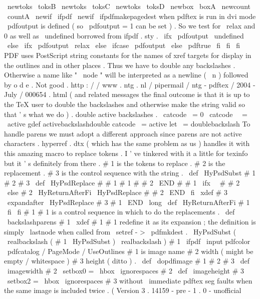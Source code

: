 {\
newtoks
\
toksB
\
newtoks
\
toksC
\
newtoks
\
toksD
\
newbox
\
boxA
\
newcount
\
countA
\
newif
\
ifpdf
\
newif
\
ifpdfmakepagedest
%
when
pdftex
is
run
in
dvi
mode
\
pdfoutput
is
defined
(
so
\
pdfoutput
=
1
%
can
be
set
)
.
So
we
test
for
\
relax
and
0
as
well
as
\
undefined
%
borrowed
from
ifpdf
.
sty
.
\
ifx
\
pdfoutput
\
undefined
\
else
\
ifx
\
pdfoutput
\
relax
\
else
\
ifcase
\
pdfoutput
\
else
\
pdftrue
\
fi
\
fi
\
fi
%
PDF
uses
PostScript
string
constants
for
the
names
of
xref
targets
%
for
display
in
the
outlines
and
in
other
places
.
Thus
we
have
to
%
double
any
backslashes
.
Otherwise
a
name
like
"
\
node
"
will
be
%
interpreted
as
a
newline
(
\
n
)
followed
by
o
d
e
.
Not
good
.
%
http
:
/
/
www
.
ntg
.
nl
/
pipermail
/
ntg
-
pdftex
/
2004
-
July
/
000654
.
html
%
(
and
related
messages
the
final
outcome
is
that
it
is
up
to
the
TeX
%
user
to
double
the
backslashes
and
otherwise
make
the
string
valid
so
%
that
'
s
what
we
do
)
.
%
double
active
backslashes
.
%
{
\
catcode
\
=
0
\
catcode
\
\
=
\
active
gdef
activebackslashdouble
{
%
catcode
\
=
active
let
\
=
doublebackslash
}
}
%
To
handle
parens
we
must
adopt
a
different
approach
since
parens
are
%
not
active
characters
.
hyperref
.
dtx
(
which
has
the
same
problem
as
%
us
)
handles
it
with
this
amazing
macro
to
replace
tokens
.
I
'
ve
%
tinkered
with
it
a
little
for
texinfo
but
it
'
s
definitely
from
there
.
%
%
#
1
is
the
tokens
to
replace
.
%
#
2
is
the
replacement
.
%
#
3
is
the
control
sequence
with
the
string
.
%
\
def
\
HyPsdSubst
#
1
#
2
#
3
{
%
\
def
\
HyPsdReplace
#
#
1
#
1
#
#
2
\
END
{
%
#
#
1
%
\
ifx
\
\
#
#
2
\
\
%
\
else
#
2
%
\
HyReturnAfterFi
{
%
\
HyPsdReplace
#
#
2
\
END
}
%
\
fi
}
%
\
xdef
#
3
{
\
expandafter
\
HyPsdReplace
#
3
#
1
\
END
}
%
}
\
long
\
def
\
HyReturnAfterFi
#
1
\
fi
{
\
fi
#
1
}
%
#
1
is
a
control
sequence
in
which
to
do
the
replacements
.
\
def
\
backslashparens
#
1
{
%
\
xdef
#
1
{
#
1
}
%
redefine
it
as
its
expansion
;
the
definition
is
simply
%
\
lastnode
when
called
from
\
setref
-
>
\
pdfmkdest
.
\
HyPsdSubst
{
(
}
{
\
realbackslash
(
}
{
#
1
}
%
\
HyPsdSubst
{
)
}
{
\
realbackslash
)
}
{
#
1
}
%
}
\
ifpdf
\
input
pdfcolor
\
pdfcatalog
{
/
PageMode
/
UseOutlines
}
%
%
#
1
is
image
name
#
2
width
(
might
be
empty
/
whitespace
)
#
3
height
(
ditto
)
.
\
def
\
dopdfimage
#
1
#
2
#
3
{
%
\
def
\
imagewidth
{
#
2
}
\
setbox0
=
\
hbox
{
\
ignorespaces
#
2
}
%
\
def
\
imageheight
{
#
3
}
\
setbox2
=
\
hbox
{
\
ignorespaces
#
3
}
%
%
without
\
immediate
pdftex
seg
faults
when
the
same
image
is
%
included
twice
.
(
Version
3
.
14159
-
pre
-
1
.
0
-
unofficial
}}
